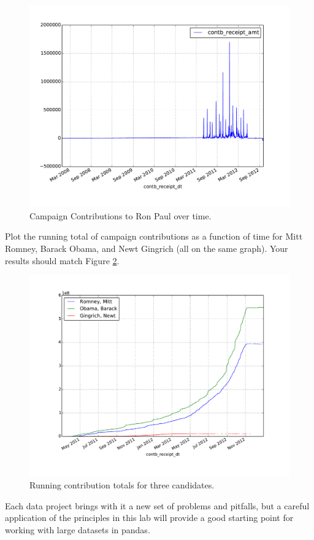 \begin{figure}
\centering
\includegraphics[width=\textwidth]{paul.pdf}
\caption{Campaign Contributions to Ron Paul over time.}
\label{pandas:paul}
\end{figure}

\begin{problem}
Plot the running total of campaign contributions as a function of time
for Mitt Romney, Barack Obama, and Newt Gingrich (all on the same graph). 
Your results should match Figure \ref{pandas:cand_time}.
\end{problem}
\begin{figure}
\centering
\includegraphics[width=\textwidth]{cand_time.pdf}
\caption{Running contribution totals for three candidates.}
\label{pandas:cand_time}
\end{figure}

Each data project brings with it a new set of problems and pitfalls, but a careful application of the principles 
in this lab will provide a good starting point for working with large datasets in pandas.

